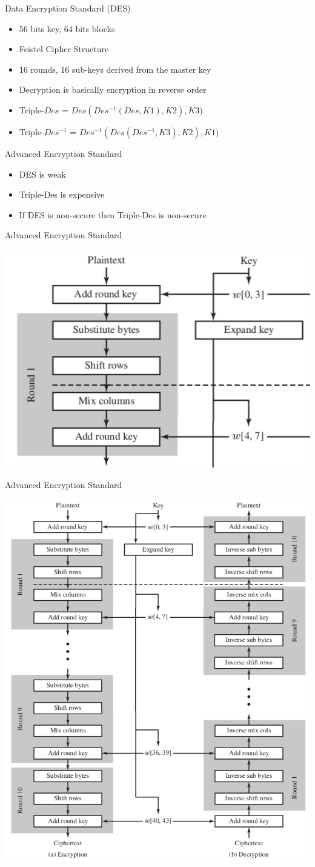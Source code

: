 \documentclass{beamer}
\begin{document}
\begin{frame}{Data Encryption Standard (DES)}
  \begin{itemize}
  \item 56 bits key, 64 bits blocks 
  \item Feistel Cipher Structure
  \item 16 rounds, 16 sub-keys derived from the master key
  \item Decryption is basically encryption in reverse order
  \item Triple-$Des$ = $Des(Des^{-1}(Des, K1), K2), K3)$
  \item Triple-$Des^{-1}$ = $Des^{-1}(Des(Des^{-1}, K3), K2), K1)$
  \end{itemize}
\end{frame}

\begin{frame}{Advanced Encryption Standard}
  \begin{itemize}
  \item DES is weak
  \item Triple-Des is expensive
  \item If DES is non-secure then Triple-Des is non-secure
  \end{itemize}
\end{frame}

  \begin{frame}{Advanced Encryption Standard}
  \begin{center}
    \includegraphics[width=0.50\linewidth]{AES-round}
  \end{center}
\end{frame}

\begin{frame}{Advanced Encryption Standard}
  \begin{center}
    \includegraphics[width=0.50\linewidth]{AES}
  \end{center}
\end{frame}
\end{document}
